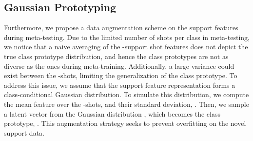 \documentclass[10pt,twocolumn,letterpaper]{article}
\begin{document}
\subsection{Gaussian Prototyping}
Furthermore, we propose a data augmentation scheme on the support features during meta-testing. Due to the limited number of shots per class in meta-testing, we notice that a naive averaging of the -support shot features does not depict the true class prototype distribution, and hence the class prototypes are not as diverse as the ones during meta-training. Additionally, a large variance could exist between the -shots, limiting the generalization of the class prototype. To address this issue, we assume that the support feature representation forms a class-conditional Gaussian distribution. To simulate this distribution, we compute the mean feature  over the -shots, and their standard deviation, . Then, we sample a latent vector  from the Gaussian distribution , which becomes the class prototype, . This augmentation strategy seeks to prevent overfitting on the novel support data. 
\end{document}
